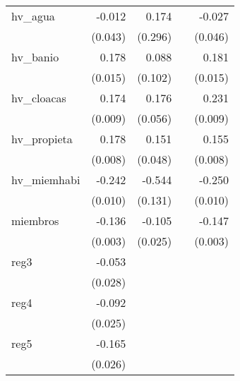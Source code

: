 {\begin{longtable}{l*{4}{D{.}{.}{-1}}}
\addlinespace
hv\_agua     &      -0.012         &       0.174         &                     &      -0.027         \\
            &     (0.043)         &     (0.296)         &                     &     (0.046)         \\
\addlinespace
hv\_banio    &       0.178\sym{***}&       0.088         &                     &       0.181\sym{***}\\
            &     (0.015)         &     (0.102)         &                     &     (0.015)         \\
\addlinespace
hv\_cloacas  &       0.174\sym{***}&       0.176\sym{**} &                     &       0.231\sym{***}\\
            &     (0.009)         &     (0.056)         &                     &     (0.009)         \\
\addlinespace
hv\_propieta &       0.178\sym{***}&       0.151\sym{**} &                     &       0.155\sym{***}\\
            &     (0.008)         &     (0.048)         &                     &     (0.008)         \\
\addlinespace
hv\_miemhabi &      -0.242\sym{***}&      -0.544\sym{***}&                     &      -0.250\sym{***}\\
            &     (0.010)         &     (0.131)         &                     &     (0.010)         \\
\addlinespace
miembros    &      -0.136\sym{***}&      -0.105\sym{***}&                     &      -0.147\sym{***}\\
            &     (0.003)         &     (0.025)         &                     &     (0.003)         \\
\addlinespace
reg3        &      -0.053         &                     &                     &                     \\
            &     (0.028)         &                     &                     &                     \\
\addlinespace
reg4        &      -0.092\sym{***}&                     &                     &                     \\
            &     (0.025)         &                     &                     &                     \\
\addlinespace
reg5        &      -0.165\sym{***}&                     &                     &                     \\
            &     (0.026)         &                     &                     &                     \\

\end{longtable}}
